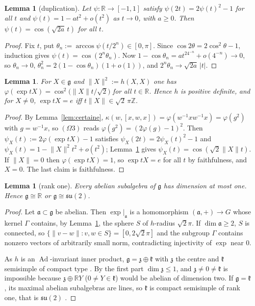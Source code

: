 \documentclass[11pt,reqno]{amsart}
\newtheorem{lemma}[theorem]{Lemma}
\theoremstyle{definition}
\theoremstyle{remark}
\numberwithin{equation}{section}
\newcommand{\R}{\mathbb{R}}
\newcommand{\Z}{\mathbb{Z}}
\newcommand{\g}{\mathfrak{g}}
\newcommand{\z}{\mathfrak{z}}
\newcommand{\kk}{\mathfrak{k}}
\newcommand{\su}{\mathfrak{su}}
\newcommand{\Ad}{\operatorname{Ad}}
\newcommand{\hp}[3]{[#1,#2,#3]}
\begin{document}
\begin{lemma}[duplication]\label{lem:dup}
Let $\psi\colon\R\to[-1,1]$ satisfy $\psi(2t)=2\psi(t)^2-1$ for all $t$ and $\psi(t)=1-at^2+o(t^2)$ as
$t\to0$, with $a\ge0$.  Then $\psi(t)=\cos(\sqrt{2a}\,t)$ for all $t$.
\end{lemma}
\begin{proof}
Fix $t$, put $\theta_n:=\arccos\psi(t/2^n)\in[0,\pi]$.  Since $\cos2\theta=2\cos^2\theta-1$, induction
gives $\psi(t)=\cos(2^n\theta_n)$.  Now $1-\cos\theta_n=at^24^{-n}+o(4^{-n})\to0$, so $\theta_n\to0$,
$\theta_n^2=2(1-\cos\theta_n)(1+o(1))$, and $2^n\theta_n\to\sqrt{2a}\,\lvert t\rvert$.
\end{proof}

\begin{lemma}\label{lem:closing}
For $X\in\g$ and $\lVert X\rVert^2:=h(X,X)$ one has $\varphi(\exp tX)=\cos^2\bigl(\lVert X\rVert t/\sqrt2\bigr)$
for all $t\in\R$.  Hence $h$ is positive definite, and for $X\ne0$, $\exp tX=e$ iff
$t\lVert X\rVert\in\sqrt2\,\pi\Z$.
\end{lemma}
\begin{proof}
By Lemma~\ref{lem:certaine}, $\kappa(w,\hp xwx)=\varphi(w^{-1}xw^{-1}x)=\varphi(g^2)$ with $g=w^{-1}x$, so
$(\Omega3)$ reads $\varphi(g^2)=(2\varphi(g)-1)^2$.  Then $\psi_X(t):=2\varphi(\exp tX)-1$ satisfies
$\psi_X(2t)=2\psi_X(t)^2-1$ and $\psi_X(t)=1-\lVert X\rVert^2t^2+o(t^2)$; Lemma~\ref{lem:dup} gives
$\psi_X(t)=\cos(\sqrt2\lVert X\rVert t)$.  If $\lVert X\rVert=0$ then $\varphi(\exp tX)=1$, so $\exp tX=e$
for all $t$ by faithfulness, and $X=0$.  The last claim is faithfulness.
\end{proof}

\begin{lemma}[rank one]\label{lem:rankone}
Every abelian subalgebra of $\g$ has dimension at most one.  Hence $\g\cong\R$ or $\g\cong\su(2)$.
\end{lemma}
\begin{proof}
Let $\mathfrak a\subset\g$ be abelian.  Then $\exp|_{\mathfrak a}$ is a homomorphism $(\mathfrak a,+)\to G$
whose kernel $\Gamma$ contains, by Lemma~\ref{lem:closing}, the sphere $S$ of $h$-radius $\sqrt2\pi$.  If
$\dim\mathfrak a\ge2$, $S$ is connected, so $\{\lVert v-w\rVert:v,w\in S\}=[0,2\sqrt2\pi]$ and the subgroup
$\Gamma$ contains nonzero vectors of arbitrarily small norm, contradicting injectivity of $\exp$ near $0$.

As $h$ is an $\Ad$-invariant inner product, $\g=\z\oplus\kk$ with $\z$ the centre and $\kk$ semisimple of
compact type \cite[\S7, Lemmas~7.4--7.5]{Milnor}.  By the first part $\dim\z\le1$, and $\z\ne0\ne\kk$ is impossible
because $\z\oplus\R Y$ ($0\ne Y\in\kk$) would be abelian of dimension two.  If $\g=\kk$, its maximal abelian
subalgebras are lines, so $\kk$ is compact semisimple of rank one, that is $\su(2)$ \cite[Ch.~IV]{Knapp}.
\end{proof}
\end{document}
